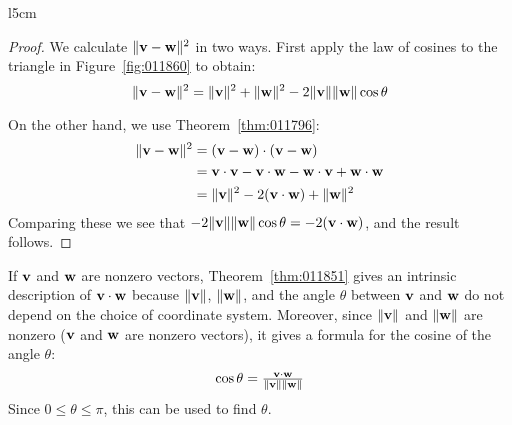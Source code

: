 \begin{wrapfigure}[4]{l}{5cm}
\vspace*{-2em} 
\centering

\caption{\label{fig:011860}}
\end{wrapfigure}

\begin{proof} We calculate $\|\textbf{v} - \textbf{w}\|^{2}$ in two ways. First apply the law of cosines to the triangle in Figure~\ref{fig:011860} to obtain:
\begin{equation*}
\| \textbf{v} - \textbf{w} \|^2 = \| \textbf{v} \|^2 + \| \textbf{w} \|^2 - 2\| \textbf{v} \| \| \textbf{w} \| \cos\theta
\end{equation*}

\vspace{1em}
\noindent On the other hand, we use Theorem~\ref{thm:011796}:
\begin{align*}
\| \textbf{v} - \textbf{w} \|^2 &= (\textbf{v} - \textbf{w}) \cdot (\textbf{v} - \textbf{w}) \\
		&= \textbf{v} \cdot \textbf{v} - \textbf{v} \cdot \textbf{w} - \textbf{w} \cdot \textbf{v} + \textbf{w} \cdot \textbf{w} \\
		&= \| \textbf{v} \|^2 - 2(\textbf{v} \cdot \textbf{w}) + \| \textbf{w} \|^2
\end{align*}
Comparing these we see that $-2 \|\textbf{v}\|\|\textbf{w}\| \cos \theta = -2(\textbf{v} \cdot \textbf{w})$, and the result follows.
\end{proof}

If $\textbf{v}$ and $\textbf{w}$ are nonzero vectors, Theorem~\ref{thm:011851} gives an intrinsic description of $\textbf{v} \cdot \textbf{w}$ because $\|\textbf{v}\|$, $\|\textbf{w}\|$, and the angle $\theta$ between $\textbf{v}$ and $\textbf{w}$ do not depend on the choice of coordinate system. Moreover, since $\|\textbf{v}\|$ and $\|\textbf{w}\|$ are nonzero ($\textbf{v}$ and $\textbf{w}$ are nonzero vectors), it gives a formula for the cosine of the angle $\theta$:
\begin{equation}\label{eq:costheta}
\cos\theta = \tfrac{\textbf{v} \cdot \textbf{w}}{\| \textbf{v} \| \| \textbf{w} \|}
\end{equation}
Since $0 \leq \theta \leq \pi$, this can be used to find $\theta$.


